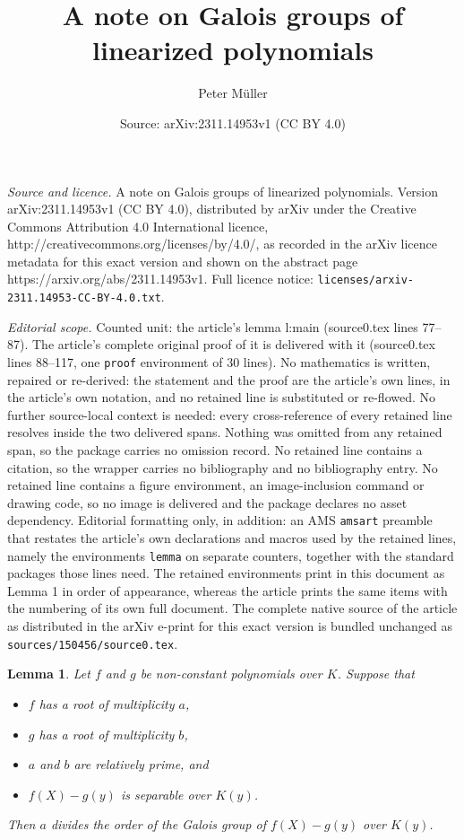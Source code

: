 \documentclass[10pt,a4paper]{amsart}
\title{A note on Galois groups of linearized polynomials}
\author{Peter M\"uller}
\date{Source: arXiv:2311.14953v1 (CC BY 4.0)}
\newtheorem{lemma}{Lemma}
\begin{document}
\maketitle

\noindent\emph{Source and licence.} A note on Galois groups of linearized polynomials. Version arXiv:2311.14953v1 (CC BY 4.0), distributed by arXiv under the Creative Commons Attribution 4.0 International licence, http://creativecommons.org/licenses/by/4.0/, as recorded in the arXiv licence metadata for this exact version and shown on the abstract page https://arxiv.org/abs/2311.14953v1. Full licence notice: \texttt{licenses/arxiv-2311.14953-CC-BY-4.0.txt}.\par\smallskip

\noindent\textit{Editorial scope.} Counted unit: the article's lemma l:main (source0.tex lines 77--87). The article's complete original proof of it is delivered with it (source0.tex lines 88--117, one \texttt{proof} environment of 30 lines). No mathematics is written, repaired or re-derived: the statement and the proof are the article's own lines, in the article's own notation, and no retained line is substituted or re-flowed.  No further source-local context is needed: every cross-reference of every retained line resolves inside the two delivered spans.  Nothing was omitted from any retained span, so the package carries no omission record.  No retained line contains a citation, so the wrapper carries no bibliography and no bibliography entry.  No retained line contains a figure environment, an image-inclusion command or drawing code, so no image is delivered and the package declares no asset dependency.  Editorial formatting only, in addition: an AMS \texttt{amsart} preamble that restates the article's own declarations and macros used by the retained lines, namely the environments \texttt{lemma} on separate counters, together with the standard packages those lines need.  The retained environments print in this document as Lemma 1 in order of appearance, whereas the article prints the same items with the numbering of its own full document.  The complete native source of the article as distributed in the arXiv e-print for this exact version is bundled unchanged as \texttt{sources/150456/source0.tex}.
\begin{lemma}\label{l:main}
  Let $f$ and $g$ be non-constant polynomials over $K$. Suppose that
  \begin{itemize}
  \item[(i)] $f$ has a root of multiplicity $a$,
  \item[(ii)] $g$ has a root of multiplicity $b$,
  \item[(iii)] $a$ and $b$ are relatively prime, and
  \item[(iv)] $f(X)-g(y)$ is separable over $K(y)$.
  \end{itemize}
  Then $a$ divides the order of the Galois group of $f(X)-g(y)$ over
  $K(y)$.
\end{lemma}
\end{document}
